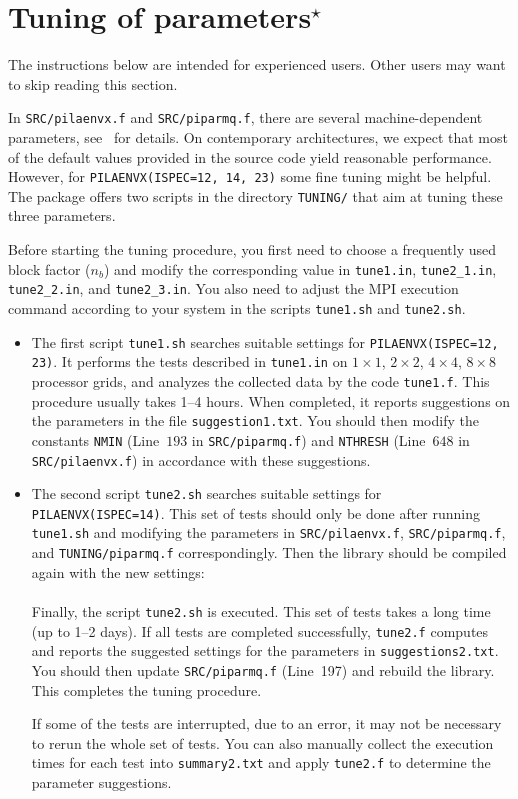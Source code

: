 \documentclass{article}
\begin{document}
\section{Tuning of parameters$^\star$}
The instructions below are intended for experienced users.
Other users may want to skip reading this section.

In \texttt{SRC/pilaenvx.f} and \texttt{SRC/piparmq.f}, there are several
machine-dependent parameters, see~\cite{GKKS2013} for details.
On contemporary architectures, we expect that most of the default values provided in the source code
yield reasonable performance.
However, for \texttt{PILAENVX(ISPEC=12, 14, 23)} some fine tuning might be
helpful.
The package offers two scripts in the directory
\texttt{TUNING/} that aim at tuning these three parameters.

Before starting the tuning procedure, you first need to choose a frequently
used block factor ($n_b$) and modify the corresponding value in
\texttt{tune1.in}, \texttt{tune2\_1.in}, \texttt{tune2\_2.in}, and
\texttt{tune2\_3.in}.
You also need to adjust the MPI execution command according to your system in
the scripts \texttt{tune1.sh} and \texttt{tune2.sh}.

\begin{itemize}
\item The first script \texttt{tune1.sh} searches suitable settings for
\texttt{PILAENVX(ISPEC=12, 23)}.
It performs the tests described in \texttt{tune1.in} on $1\times1$,
$2\times2$, $4\times4$, $8\times8$ processor grids, and analyzes the collected
data by the code \texttt{tune1.f}.
This procedure usually takes 1--4 hours.
When completed, it reports suggestions on the parameters in the file
\texttt{suggestion1.txt}.
You should then modify the constants \texttt{NMIN} (Line~$193$ in
\texttt{SRC/piparmq.f}) and \texttt{NTHRESH} (Line~$648$ in
\texttt{SRC/pilaenvx.f}) in accordance with these suggestions.

\item The second script \texttt{tune2.sh} searches suitable settings for
\texttt{PILAENVX(ISPEC=14)}.
This set of tests should only be done after running \texttt{tune1.sh}
and modifying
the parameters in \texttt{SRC/pilaenvx.f}, \texttt{SRC/piparmq.f}, and
\texttt{TUNING/piparmq.f} correspondingly.
Then the library should be compiled again with the new settings:\\
\medskip
{}\\
Finally, the script \texttt{tune2.sh} is executed.
This set of tests takes a long time (up to 1--2 days).
If all tests are completed successfully, \texttt{tune2.f} computes
and reports the suggested settings for the parameters in
\texttt{suggestions2.txt}.
You should then update \texttt{SRC/piparmq.f} (Line~197) and rebuild the
library.
This completes the tuning procedure.

If some of the tests are interrupted, due to an error, it may not be necessary to rerun
the whole set of tests.
You can also manually collect the execution times for each test into
\texttt{summary2.txt} and apply \texttt{tune2.f} to determine the parameter suggestions.
\end{itemize}
\end{document}
